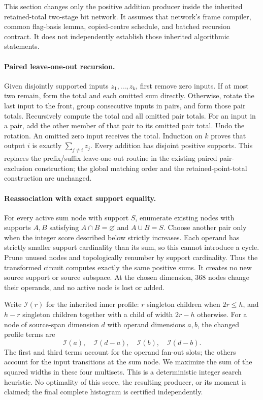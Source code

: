 \documentclass[11pt]{article}
\begin{document}
This section changes only the positive addition producer inside the inherited
retained-total two-stage bit network. It assumes that network's frame compiler,
common flag-basis lemma, copied-centre schedule, and batched recursion contract.
It does not independently establish those inherited algorithmic statements.

\paragraph{Paired leave-one-out recursion.}
Given disjointly supported inputs $z_1,\ldots,z_k$, first remove zero inputs.
If at most two remain, form the total and each omitted sum directly. Otherwise,
rotate the last input to the front, group consecutive inputs in pairs, and form
those pair totals. Recursively compute the total and all omitted pair totals.
For an input in a pair, add the other member of that pair to its omitted pair
total. Undo the rotation. An omitted zero input receives the total.
Induction on $k$ proves that output $i$ is exactly $\sum_{j\ne i}z_j$.
Every addition has disjoint positive supports. This replaces the prefix/suffix
leave-one-out routine in the existing paired pair-exclusion construction;
the global matching order and the retained-point-total construction are unchanged.

\paragraph{Reassociation with exact support equality.}
For every active sum node with support $S$, enumerate existing nodes with
supports $A,B$ satisfying $A\cap B=\varnothing$ and $A\cup B=S$.
Choose another pair only when the integer score described below strictly
increases. Each operand has strictly smaller support cardinality than its sum,
so this cannot introduce a cycle. Prune unused nodes and topologically renumber
by support cardinality. Thus the transformed circuit computes exactly the same
positive sums. It creates no new source support or source subspace.
At the chosen dimension, 368 nodes change their operands, and no active node
is lost or added.

Write $\mathcal I(r)$ for the inherited inner profile: $r$ singleton children
when $2r\le h$, and $h-r$ singleton children together with a child of width
$2r-h$ otherwise. For a node of source-span dimension $d$ with operand dimensions
$a,b$, the changed profile terms are
\[
 \mathcal I(a),\quad\mathcal I(d-a),\quad
 \mathcal I(b),\quad\mathcal I(d-b).
\]
The first and third terms account for the operand fan-out slots; the others
account for the input transitions at the sum node. We maximize the sum of the
squared widths in these four multisets. This is a deterministic integer search
heuristic. No optimality of this score, the resulting producer, or its moment
is claimed; the final complete histogram is certified independently.
\end{document}
